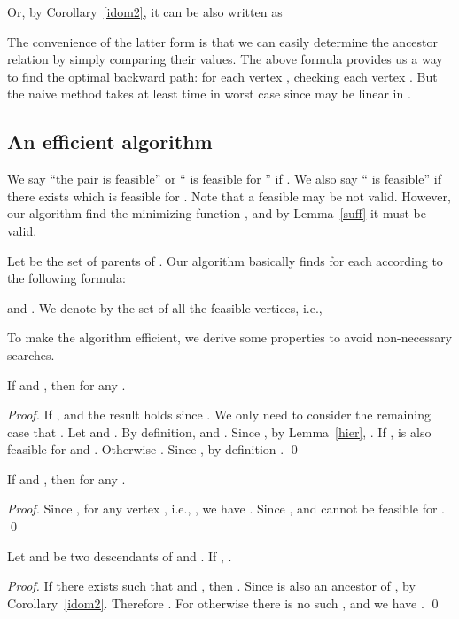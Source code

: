 Or, by Corollary~\ref{idom2}, it can be also written as 

The convenience of the latter form is that we can easily determine the ancestor relation by simply comparing their  values.
The above formula provides us a way to find the optimal backward path: for each vertex , checking each vertex . But the naive method takes at least  time in worst case since  may be linear in . 


\subsection{An efficient algorithm}
We say ``the pair  is feasible'' or `` is feasible for '' if . We also say `` is feasible'' if there exists  which is feasible for .
Note that a feasible  may be not valid. However, our algorithm find the  minimizing function , and by Lemma~\ref{suff} it must be valid.

Let  be the set of parents of .
Our algorithm basically finds  for each  according to the following formula: 

and .
We denote by  the set of all the feasible vertices, i.e.,


 
To make the algorithm efficient, we derive some properties to avoid non-necessary searches.
\begin{lemma}\label{fp}
If  and , then  for any .
\end{lemma}
\begin{proof}
If ,  and the result holds since .
We only need to consider the remaining case that .
Let  and .
By definition,  and .
Since , by Lemma~\ref{hier}, . 
If ,  is also feasible for  and .
Otherwise . Since , by definition .
\qed\end{proof}
\begin{lemma}\label{nfp}
If  and , then  for any .
\end{lemma}
\begin{proof}
Since , for any vertex , i.e., , we have .
Since ,   and  cannot be feasible for . 
\qed\end{proof}

\begin{lemma}\label{desf}
Let  and  be two descendants of  and .
If ,  
. 
\end{lemma}
\begin{proof}
If there exists  such that  and , then . Since  is also an ancestor of ,  by Corollary~\ref{idom2}. Therefore .
For otherwise there is no such , and we have .
\qed\end{proof}

